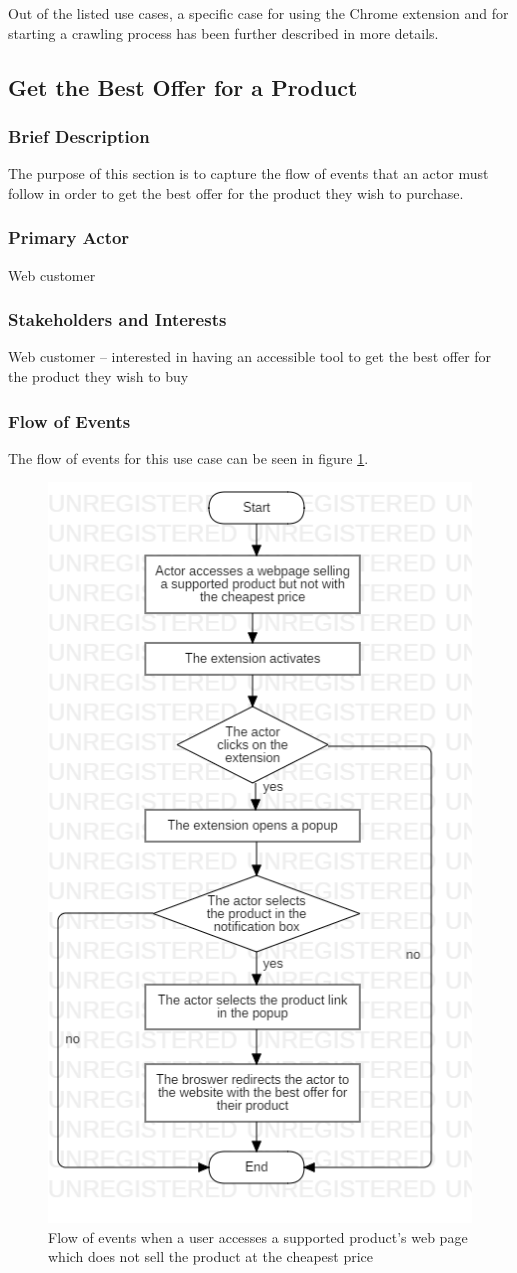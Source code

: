 \documentclass[12pt,a4paper,twoside]{report}
\begin{document}
Out of the listed use cases, a specific case for using the Chrome extension and for starting a crawling process has been further described in more details.


\subsection{Get the Best Offer for a Product} \label{sec:use_case_not_cheapest}

\subsubsection{Brief Description}

The purpose of this section is to capture the flow of events that an actor must follow in order to get the best offer for the product they wish to purchase.


\subsubsection{Primary Actor}

Web customer


\subsubsection{Stakeholders and Interests}

Web customer – interested in having an accessible tool to get the best offer for the product they wish to buy


\subsubsection{Flow of Events}

The flow of events for this use case can be seen in figure \ref{fig:flow_not_cheapest_offer}.

\begin{figure}[ht]
  \centering
  \includegraphics[width=0.4\linewidth]{img/flow_not_cheapest_offer.png}
  \caption{Flow of events when a user accesses a supported product's web page which does not sell the product at the cheapest price}
  \label{fig:flow_not_cheapest_offer}
\end{figure}
\end{document}

